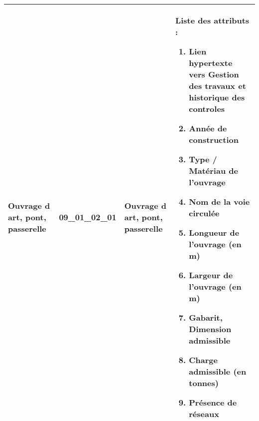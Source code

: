 \documentclass[12pt,titlepage]{book}
\begin{document}
\renewcommand{\arraystretch}{1.2}
\begin{supertabular}{|p{10cm}|c|p{13cm}|p{12cm}|}
 Ouvrage d art, pont, passerelle & 09\_01\_02\_01 & Ouvrage d art, pont, passerelle & Liste des attributs :
\begin{enumerate}
  \item Lien hypertexte vers Gestion des travaux et historique des controles  \item Année de construction  \item Type / Matériau de l'ouvrage  \item Nom de la voie circulée  \item Longueur de l'ouvrage (en m)  \item Largeur de l'ouvrage (en m)  \item Gabarit, Dimension admissible  \item Charge admissible (en tonnes)  \item Présence de réseaux\end{enumerate}
\\
\hline
\end{supertabular}
\end{document}
